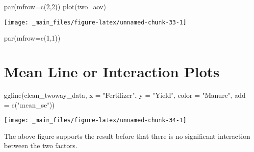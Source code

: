 \documentclass[
]{book}
\newenvironment{Shaded}{\begin{snugshade}}{\end{snugshade}}
\newcommand{\AttributeTok}[1]{\textcolor[rgb]{0.77,0.63,0.00}{#1}}
\newcommand{\DecValTok}[1]{\textcolor[rgb]{0.00,0.00,0.81}{#1}}
\newcommand{\FunctionTok}[1]{\textcolor[rgb]{0.00,0.00,0.00}{#1}}
\newcommand{\NormalTok}[1]{#1}
\newcommand{\StringTok}[1]{\textcolor[rgb]{0.31,0.60,0.02}{#1}}
\begin{document}
\begin{Shaded}
\begin{Highlighting}[]
\FunctionTok{par}\NormalTok{(}\AttributeTok{mfrow=}\FunctionTok{c}\NormalTok{(}\DecValTok{2}\NormalTok{,}\DecValTok{2}\NormalTok{))}
\FunctionTok{plot}\NormalTok{(two\_aov)}
\end{Highlighting}
\end{Shaded}

\begin{center}\texttt{[image: \_main\_files/figure-latex/unnamed-chunk-33-1]} \end{center}

\begin{Shaded}
\begin{Highlighting}[]
\FunctionTok{par}\NormalTok{(}\AttributeTok{mfrow=}\FunctionTok{c}\NormalTok{(}\DecValTok{1}\NormalTok{,}\DecValTok{1}\NormalTok{))}
\end{Highlighting}
\end{Shaded}

\hypertarget{mean-line-or-interaction-plots}{%
\chapter{Mean Line or Interaction Plots}\label{mean-line-or-interaction-plots}}

\begin{Shaded}
\begin{Highlighting}[]
\FunctionTok{ggline}\NormalTok{(clean\_twoway\_data,}
       \AttributeTok{x =} \StringTok{"Fertilizer"}\NormalTok{,}
       \AttributeTok{y =} \StringTok{"Yield"}\NormalTok{,}
       \AttributeTok{color =} \StringTok{"Manure"}\NormalTok{,}
       \AttributeTok{add =} \FunctionTok{c}\NormalTok{(}\StringTok{"mean\_se"}\NormalTok{))}
\end{Highlighting}
\end{Shaded}

\begin{center}\texttt{[image: \_main\_files/figure-latex/unnamed-chunk-34-1]} \end{center}

The above figure supports the result before that there is no significant interaction between the two factors.

  
\end{document}
